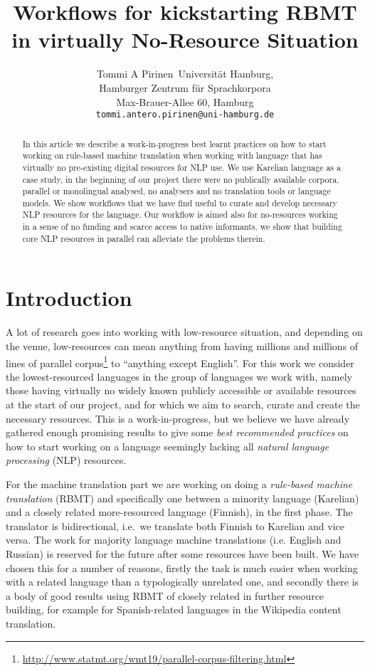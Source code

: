 \documentclass[11pt]{article}
\title{Workflows for kickstarting RBMT in virtually No-Resource Situation}
\author{Tommi A Pirinen\
  Universität Hamburg,\\
  Hamburger Zentrum für Sprachkorpora\\
  Max-Brauer-Allee 60, Hamburg\\
  {\tt tommi.antero.pirinen@uni-hamburg.de}}
\date{}
\begin{document}
\maketitle
\begin{abstract}
    In this article we describe a work-in-progress best learnt practices on how
    to start working on rule-based machine translation when working with
    language that has virtually no pre-existing digital resources for NLP use.
    We use Karelian language as a case study, in the beginning of our project
    there were no publically available corpora, parallel or monolingual
    analysed, no analysers and no translation tools or language models. We show
    workflows that we have find useful to curate and develop necessary NLP
    resources for the language. Our workflow is aimed also for no-resources
    working in a sense of no funding and scarce access to native informants, we
    show that building core NLP resources in parallel can alleviate the problems
    therein.
\end{abstract}

\section{Introduction}

A lot of research goes into working with low-resource situation, and depending
on the venue, low-resources can mean anything from having millions and millions
of lines of parallel
corpus\footnote{\url{http://www.statmt.org/wmt19/parallel-corpus-filtering.html}}
to ``anything except English''. For this work we consider the lowest-resourced
languages in the group of languages we work with, namely those having virtually
no widely known publicly accessible or available resources at the start of our
project, and for which we aim to search, curate and create the necessary
resources. This is a work-in-progress, but we believe we have already gathered
enough promising results to give some \textit{best recommended practices} on
how to start working on a language seemingly lacking all \textit{natural
language processing} (NLP) resources.

For the machine translation part we are working on doing a \textit{rule-based
machine translation} (RBMT) and specifically one between a minority language
(Karelian) and a closely related more-resourced language (Finnish), in the first
phase. The translator is bidirectional, i.e.\ we translate both Finnish to
Karelian and vice versa.  The work for majority language machine translations
(i.e. English and Russian) is reserved for the future after some resources have
been built.  We have chosen this for a number of reasons, firstly the task is
much easier when working with a related language than a typologically unrelated
one, and secondly there is a body of good results using RBMT of closely related
in further resource building, for example for Spanish-related languages in the
Wikipedia content translation.
\end{document}
